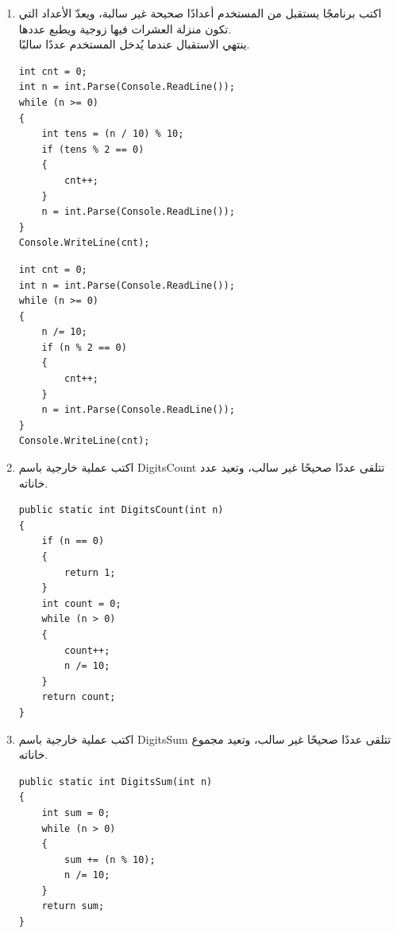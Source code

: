 \documentclass[14pt]{extarticle}
\begin{document}
\begin{enumerate}[itemsep=2em]
\item اكتب برنامجًا يستقبل من المستخدم أعدادًا صحيحة غير سالبة، ويعدّ الأعداد التي تكون منزلة العشرات فيها زوجية ويطبع عددها. \\
ينتهي الاستقبال عندما يُدخل المستخدم عددًا سالبًا.
\ifwithsols
\begin{boxSolution}[1]
\begin{english}
\begin{verbatim}
int cnt = 0;
int n = int.Parse(Console.ReadLine());
while (n >= 0)
{
    int tens = (n / 10) % 10;
    if (tens % 2 == 0)
    {
        cnt++;
    }
    n = int.Parse(Console.ReadLine());
}
Console.WriteLine(cnt);
\end{verbatim}
\end{english}
\end{boxSolution}

\filbreak

\begin{boxSolution}
\begin{english}
\begin{verbatim}
int cnt = 0;
int n = int.Parse(Console.ReadLine());
while (n >= 0)
{
    n /= 10;
    if (n % 2 == 0)
    {
        cnt++;
    }
    n = int.Parse(Console.ReadLine());
}
Console.WriteLine(cnt);
\end{verbatim}
\end{english}
\end{boxSolution}
\fi
\filbreak

\item \label{item:digitCount} اكتب عملية خارجية باسم \textenglish{DigitsCount} تتلقى عددًا صحيحًا غير سالب، وتعيد عدد خاناته.
\ifwithsols
\begin{boxSolution}
\begin{english}
\begin{verbatim}
public static int DigitsCount(int n)
{
    if (n == 0)
    {
        return 1;
    }
    int count = 0;
    while (n > 0)
    {
        count++;
        n /= 10;
    }
    return count;
}
\end{verbatim}
\end{english}
\end{boxSolution}
\fi
\filbreak

\item اكتب عملية خارجية باسم \textenglish{DigitsSum} تتلقى عددًا صحيحًا غير سالب، وتعيد مجموع خاناته.
\ifwithsols
\begin{boxSolution}
\begin{english}
\begin{verbatim}
public static int DigitsSum(int n)
{
    int sum = 0;
    while (n > 0)
    {
        sum += (n % 10);
        n /= 10;
    }
    return sum;
}
\end{verbatim}
\end{english}
\end{boxSolution}
\fi
\filbreak


\end{enumerate}
\end{document}
